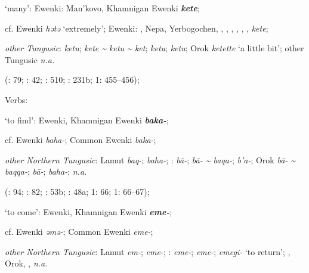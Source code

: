 \documentclass[output=paper,colorlinks,citecolor=brown]{langscibook}
\begin{document}
\begin{xlist}
\begin{xlist}
    \ex ‘many’:  Ewenki: Man’kovo, Khamnigan Ewenki \textbf{\textit{kete}};

    cf.  Ewenki \textit{hǝtǝ} ‘extremely’;  Ewenki: , Nepa, Yerbogochen, , , , , , ,  \textit{kete};

    \textit{other Tungusic}:  \textit{ketu};  \textit{kete {\textasciitilde} ketu {\textasciitilde} ket};  \textit{ketu};  \textit{ketu}; Orok \textit{ketette} ‘a little bit’; other Tungusic \textit{n.a.}
    
    (\citealt{Castrén1856}: 79; \citealt{Janhunen1991}: 42; \citealt{Chaoke2014bB}: 510; \citealt{Vasilevic1958}: 231b; \citealt{Cincius1975B} 1: 455--456);

\end{xlist}


    \ex Verbs:

\begin{xlist}
    \ex ‘to find’:  Ewenki, Khamnigan Ewenki \textbf{\textit{baka-}};

    cf.  Ewenki \textit{baha-};  Common Ewenki \textit{baka-};

    \textit{other Northern Tungusic}: Lamut \textit{baq-};  \textit{baha-}; \textit{}:  \textit{bā-};  \textit{bā- {\textasciitilde} baqa-};  \textit{b’a-}; Orok \textit{bā- {\textasciitilde} baqqa-};  \textit{bā-};  \textit{baha-};  \textit{n.a.}
    
    (\citealt{Castrén1856}: 94; \citealt{Janhunen1991}: 82; \citealt{Dorji1998}: 53b; \citealt{Vasilevic1958}: 48a; \citealt{Hauer1952} 1: 66; \citealt{Cincius1975B} 1: 66--67);

    \ex ‘to come’:  Ewenki, Khamnigan Ewenki \textbf{\textit{eme-}};

    cf.  Ewenki \textit{ǝmǝ-};  Common Ewenki \textit{eme-};

    \textit{other Northern Tungusic}: Lamut \textit{em-};  \textit{eme-}; \textit{}:  \textit{eme-};  \textit{eme-};  \textit{emegi-} ‘to return’; , Orok, ,  \textit{n.a}.
    

\end{xlist}
\end{xlist}
\end{document}
